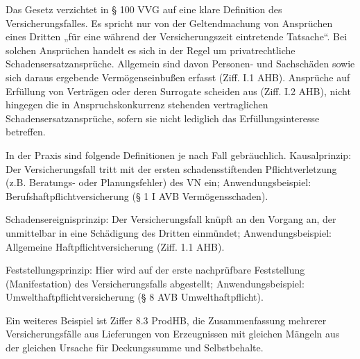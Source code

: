 Das Gesetz verzichtet in § 100 VVG auf eine klare Definition des Versicherungsfalles. 
Es spricht nur von der Geltendmachung von Ansprüchen eines Dritten „für eine während der Versicherungszeit eintretende Tatsache“. 
Bei solchen Ansprüchen handelt es sich in der Regel um privatrechtliche Schadensersatzansprüche. 
Allgemein sind davon Personen- und Sachschäden sowie sich daraus ergebende Vermögenseinbußen erfasst (Ziff. I.1 AHB). 
Ansprüche auf Erfüllung von Verträgen oder deren Surrogate scheiden aus (Ziff. I.2 AHB), nicht hingegen 
die in Anspruchskonkurrenz stehenden vertraglichen Schadensersatzansprüche, sofern sie nicht lediglich das Erfüllungsinteresse betreffen.

In der Praxis sind folgende Definitionen je nach Fall gebräuchlich.
Kausalprinzip:
Der Versicherungsfall tritt mit der ersten schadensstiftenden Pflichtverletzung 
(z.B. Beratungs- oder Planungsfehler) des VN ein; Anwendungsbeispiel: Berufshaftpflichtversicherung (§ 1 I AVB Vermögensschaden).

Schadensereignisprinzip: 
Der Versicherungsfall knüpft an den Vorgang an, der unmittelbar in eine Schädigung des Dritten einmündet; Anwendungsbeispiel: 
Allgemeine Haftpflichtversicherung (Ziff. 1.1 AHB).

Feststellungsprinzip: 
Hier wird auf der erste nachprüfbare Feststellung (Manifestation) des Versicherungsfalls abgestellt; 
Anwendungsbeispiel: Umwelthaftpflichtversicherung (§ 8 AVB Umwelthaftpflicht).

Ein weiteres Beispiel ist Ziffer 8.3 ProdHB, die Zusammenfassung mehrerer Versicherungsfälle aus Lieferungen von Erzeugnissen mit gleichen
Mängeln aus der gleichen Ursache für Deckungssumme und Selbstbehalte.
